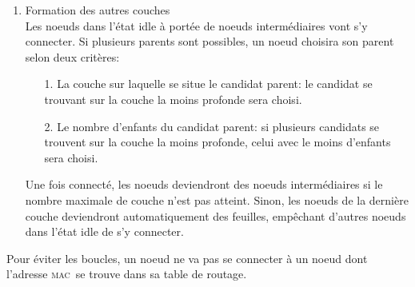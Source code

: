 \documentclass[a4paper, 12pt]{report}
\newcommand{\mac}{\textsc{mac}}
\begin{document}
\begin{enumerate}
            \item Formation des autres couches\\
                Les noeuds dans l'état idle à portée de noeuds intermédiaires vont s'y connecter. Si plusieurs parents
                sont possibles, un noeud choisira son parent selon deux critères:
                \begin{enumerate}
                    \addtolength{\itemindent}{1cm}
                    \item[1.] La couche sur laquelle se situe le candidat parent:
                        le candidat se trouvant sur la couche la moins profonde sera choisi. 
                    \item[2.] Le nombre d'enfants du candidat parent: si plusieurs candidats se trouvent
                        sur la couche la moins profonde, celui avec le moins d'enfants sera choisi. 
                \end{enumerate}
                Une fois connecté, les noeuds deviendront des noeuds intermédiaires si le nombre maximale de couche n'est pas atteint.
                Sinon, les noeuds de la dernière couche deviendront automatiquement
                des feuilles, empêchant d'autres noeuds dans l'état idle de s'y connecter.

        \end{enumerate}
        Pour éviter les boucles, un noeud ne va pas se connecter à un noeud dont l'adresse \mac\ se trouve dans sa table de routage.
        \vspace{0.5cm}
\end{document}
